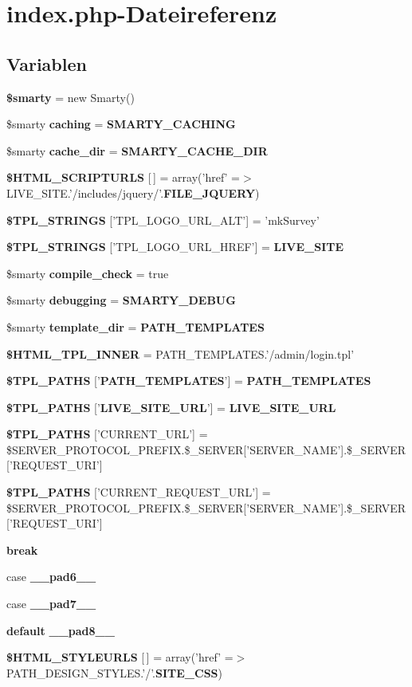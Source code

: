 \section{index.php-Dateireferenz}
\label{index_8php}
\subsection*{Variablen}
\begin{CompactItemize}
\item 
{\bf \$smarty} = new Smarty()
\item 
\$smarty {\bf caching} = {\bf SMARTY\_\-CACHING}
\item 
\$smarty {\bf cache\_\-dir} = {\bf SMARTY\_\-CACHE\_\-DIR}
\item 
{\bf \$HTML\_\-SCRIPTURLS} [$\,$] = array('href' =$>$ LIVE\_\-SITE.'/includes/jquery/'.{\bf FILE\_\-JQUERY})
\item 
{\bf \$TPL\_\-STRINGS} ['TPL\_\-LOGO\_\-URL\_\-ALT'] = 'mkSurvey'
\item 
{\bf \$TPL\_\-STRINGS} ['TPL\_\-LOGO\_\-URL\_\-HREF'] = {\bf LIVE\_\-SITE}
\item 
\$smarty {\bf compile\_\-check} = true
\item 
\$smarty {\bf debugging} = {\bf SMARTY\_\-DEBUG}
\item 
\$smarty {\bf template\_\-dir} = {\bf PATH\_\-TEMPLATES}
\item 
{\bf \$HTML\_\-TPL\_\-INNER} = PATH\_\-TEMPLATES.'/admin/login.tpl'
\item 
{\bf \$TPL\_\-PATHS} ['{\bf PATH\_\-TEMPLATES}'] = {\bf PATH\_\-TEMPLATES}
\item 
{\bf \$TPL\_\-PATHS} ['{\bf LIVE\_\-SITE\_\-URL}'] = {\bf LIVE\_\-SITE\_\-URL}
\item 
{\bf \$TPL\_\-PATHS} ['CURRENT\_\-URL'] = \$SERVER\_\-PROTOCOL\_\-PREFIX.\$\_\-SERVER['SERVER\_\-NAME'].\$\_\-SERVER['REQUEST\_\-URI']
\item 
{\bf \$TPL\_\-PATHS} ['CURRENT\_\-REQUEST\_\-URL'] = \$SERVER\_\-PROTOCOL\_\-PREFIX.\$\_\-SERVER['SERVER\_\-NAME'].\$\_\-SERVER['REQUEST\_\-URI']
\item 
{\bf break}
\item 
case {\bf \_\-\_\-pad6\_\-\_\-}
\item 
case {\bf \_\-\_\-pad7\_\-\_\-}
\item 
{\bf default} {\bf \_\-\_\-pad8\_\-\_\-}
\item 
{\bf \$HTML\_\-STYLEURLS} [$\,$] = array('href' =$>$ PATH\_\-DESIGN\_\-STYLES.'/'.{\bf SITE\_\-CSS})

\end{CompactItemize}
